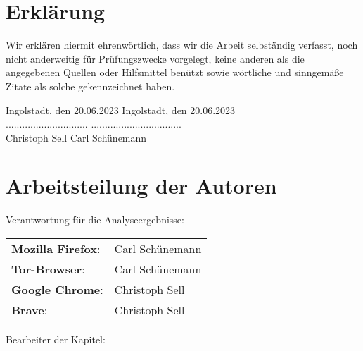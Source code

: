 \chapter*{Erklärung}

Wir erklären hiermit ehrenwörtlich, dass wir die Arbeit selbständig verfasst, noch nicht anderweitig für Prüfungszwecke vorgelegt, keine anderen als die angegebenen Quellen oder Hilfsmittel benützt sowie wörtliche und sinngemäße Zitate als solche gekennzeichnet haben.

\vspace{2cm}

Ingolstadt, den 20.06.2023 		\hfill Ingolstadt, den 20.06.2023			\\

\vspace{0.8cm}
.............................. 	\hfill .................................	\\
Christoph Sell 					\hfill Carl Schünemann						\\


\chapter*{Arbeitsteilung der Autoren}


Verantwortung für die Analyseergebnisse: 

\vspace*{0.5cm}

\begin{tabular}{ll}
	\textbf{Mozilla Firefox}: & Carl Schünemann \tabularnewline
	\textbf{Tor-Browser}: & Carl Schünemann \tabularnewline
	\textbf{Google Chrome}:	& Christoph Sell \tabularnewline
	\textbf{Brave}:	& Christoph Sell \tabularnewline
\end{tabular}

\vspace*{1cm}

Bearbeiter der Kapitel:

